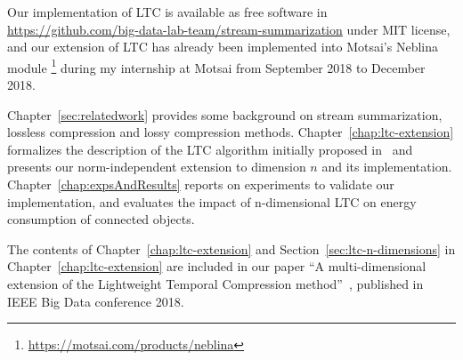 Our implementation of LTC is available as free software in
\url{https://github.com/big-data-lab-team/stream-summarization} under MIT
license, and our extension of LTC has already been implemented into Motsai's
Neblina module \footnote{\url{https://motsai.com/products/neblina}} during my
internship at Motsai from September 2018 to December 2018. 



Chapter~\ref{sec:relatedwork} provides some background on stream
summarization, lossless compression and lossy compression methods.
Chapter~\ref{chap:ltc-extension} formalizes the description of the LTC
algorithm initially proposed in~\cite{schoellhammer2004lightweight} and
presents our norm-independent extension to dimension $n$ and its
implementation. Chapter~\ref{chap:expsAndResults} reports on experiments to
validate our implementation, and evaluates the impact of n-dimensional LTC
on energy consumption of connected objects.

The contents of Chapter~\ref{chap:ltc-extension} and
Section~\ref{sec:ltc-n-dimensions} in Chapter~\ref{chap:ltc-extension} are
included in our paper ``A multi-dimensional extension of the Lightweight
Temporal Compression method''~\cite{li2018multi}, published in IEEE Big Data
conference 2018.




